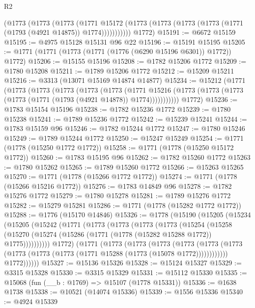 \begin{lexlean}{R2}
\begin{coremodule}
          (@1773
            (@1773
              (@1773
                (@1771
                  @15172
                  (@1773 (@1773 (@1773 (@1773 (@1771 (@1793 (@4921 @14875)) @1774)))))))))))
      @1772)
@15191 := @6672 @15159
@15195 := @4975 @15128 @15131 @96 @22
@15196 := @15191 @15195
@15205 := @1771 (@1771 (@1773 (@1771 (@1776 (@6290 @15196 @6301)) @1772)) @1772)
@15206 := @15155 @15196
@15208 := @1782 @15206 @1772
@15209 := @1780 @15208
@15211 := @1789 @15206 @1772
@15212 := @15209 @15211
@15216 := @3313 (@13071 @15169 @14874 @14877)
@15234 := @15212
    (@1771
      (@1773
        (@1773
          (@1773
            (@1773
              (@1773
                (@1771
                  @15216
                  (@1773 (@1773 (@1773 (@1773 (@1771 (@1793 (@4921 @14878)) @1774)))))))))))
      @1772)
@15236 := @1783 @15154 @15196
@15238 := @1782 @15236 @1772
@15239 := @1780 @15238
@15241 := @1789 @15236 @1772
@15242 := @15239 @15241
@15244 := @1783 @15159 @96
@15246 := @1782 @15244 @1772
@15247 := @1780 @15246
@15249 := @1789 @15244 @1772
@15250 := @15247 @15249
@15254 := @1771 (@1778 (@15250 @1772 @1772))
@15258 := @1771 (@1778 (@15250 @15172 @1772))
@15260 := @1783 @15195 @96
@15262 := @1782 @15260 @1772
@15263 := @1780 @15262
@15265 := @1789 @15260 @1772
@15266 := @15263 @15265
@15270 := @1771 (@1778 (@15266 @1772 @1772))
@15274 := @1771 (@1778 (@15266 @15216 @1772))
@15276 := @1783 @14849 @96
@15278 := @1782 @15276 @1772
@15279 := @1780 @15278
@15281 := @1789 @15276 @1772
@15282 := @15279 @15281
@15286 := @1771 (@1778 (@15282 @1772 @1772))
@15288 := @1776 (@15170 @14846)
@15326 := @1778
    (@15190
      (@15205
        (@15234
          (@15205
            (@15242
              (@1771
                (@1773
                  (@1773
                    (@1773
                      (@1773
                        (@15254
                          (@15258
                            (@15270
                              (@15274 (@15286 (@1771 (@1778 (@15282 @15288 @1772)) @1775))))))))))
                @1772)
              (@1771
                (@1773
                  (@1773
                    (@1773
                      (@1773
                        (@1773
                          (@1773 (@1773 (@1773 (@1773 (@1771 @15288 (@1773 (@15078 @1772))))))))))))
                @1772))))))
@15327 := @15136 @15326
@15328 := @15124 @15327
@15329 := @3315 @15328
@15330 := @3315 @15329
@15331 := @15112 @15330
@15335 := @15068 (fun (__b : @1769) => @15107 (@1778 @15331))
@15336 := @1638 @1738
@15338 := @10521 (@14074 @15336)
@15339 := @1556 @15336
@15340 := @4924 @15339

\end{coremodule}
\end{lexlean}
